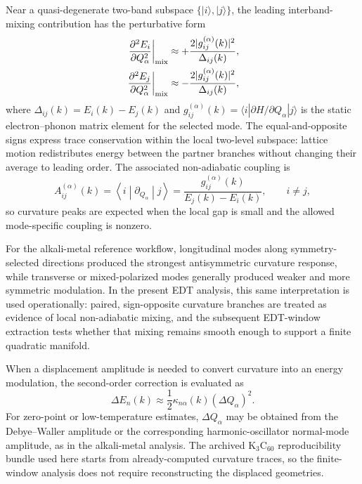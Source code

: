 \documentclass[12pt]{article}
\begin{document}
Near a quasi-degenerate two-band subspace $\{|i\rangle,|j\rangle\}$, the leading interband-mixing contribution has the perturbative form
\begin{align}
\left.\frac{\partial^2 E_i}{\partial Q_\alpha^2}\right|_{\rm mix}
&\approx +\frac{2|g_{ij}^{(\alpha)}(k)|^2}{\Delta_{ij}(k)},\\
\left.\frac{\partial^2 E_j}{\partial Q_\alpha^2}\right|_{\rm mix}
&\approx -\frac{2|g_{ij}^{(\alpha)}(k)|^2}{\Delta_{ij}(k)},
\end{align}
where $\Delta_{ij}(k)=E_i(k)-E_j(k)$ and $g_{ij}^{(\alpha)}(k)=\langle i|\partial H/\partial Q_\alpha|j\rangle$ is the static electron--phonon matrix element for the selected mode. The equal-and-opposite signs express trace conservation within the local two-level subspace: lattice motion redistributes energy between the partner branches without changing their average to leading order. The associated non-adiabatic coupling is
\begin{equation}
A_{ij}^{(\alpha)}(k)
=
\left\langle i\middle|\partial_{Q_\alpha}\middle|j\right\rangle
=
\frac{g_{ij}^{(\alpha)}(k)}{E_j(k)-E_i(k)},\qquad i\neq j,
\end{equation}
so curvature peaks are expected when the local gap is small and the allowed mode-specific coupling is nonzero.

For the alkali-metal reference workflow, longitudinal modes along symmetry-selected directions produced the strongest antisymmetric curvature response, while transverse or mixed-polarized modes generally produced weaker and more symmetric modulation. In the present EDT analysis, this same interpretation is used operationally: paired, sign-opposite curvature branches are treated as evidence of local non-adiabatic mixing, and the subsequent EDT-window extraction tests whether that mixing remains smooth enough to support a finite quadratic manifold.

When a displacement amplitude is needed to convert curvature into an energy modulation, the second-order correction is evaluated as
\begin{equation}
\Delta E_n(k)
\approx
\frac{1}{2}\kappa_{n\alpha}(k)(\Delta Q_\alpha)^2 .
\end{equation}
For zero-point or low-temperature estimates, $\Delta Q_\alpha$ may be obtained from the Debye--Waller amplitude or the corresponding harmonic-oscillator normal-mode amplitude, as in the alkali-metal analysis. The archived K$_3$C$_{60}$ reproducibility bundle used here starts from already-computed curvature traces, so the finite-window analysis does not require reconstructing the displaced geometries.
\end{document}
